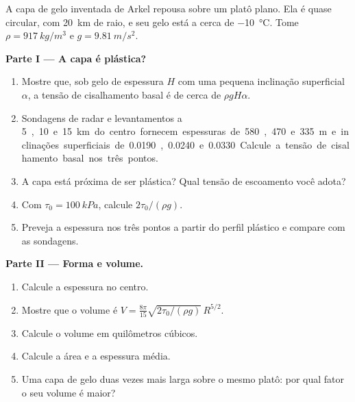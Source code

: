 \begin{problem}
\label{pb:b3:glaciology:1}
A capa de gelo inventada de Arkel repousa sobre um platô plano. Ela é quase
circular, com \qty{20}{km} de raio, e seu gelo está a cerca de \qty{-10}{\celsius}. Tome
$\rho = \qty{917}{kg/m^3}$ e $g = \qty{9.81}{m/s^2}$.

\medskip\noindent\textbf{Parte I --- A capa é plástica?}
\begin{enumerate}
\item Mostre que, sob gelo de espessura $H$ com uma pequena inclinação
  superficial $\alpha$, a tensão de cisalhamento basal é de cerca de $\rho gH\alpha$.
\item Sondagens de radar e levantamentos a \qty{5}, \qty{10} e \qty{15}{km} do centro
  fornecem espessuras de 580, 470 e \qty{335}{m} e inclinações superficiais de
  \num{0.0190}, \num{0.0240} e \num{0.0330}. Calcule a tensão de cisalhamento basal
  nos três pontos.
\item A capa está próxima de ser plástica? Qual tensão de escoamento você adota?
\item Com $\tau_0 = \qty{100}{kPa}$, calcule $2\tau_0/(\rho g)$.
\item Preveja a espessura nos três pontos a partir do perfil plástico e compare
  com as sondagens.
\end{enumerate}

\medskip\noindent\textbf{Parte II --- Forma e volume.}
\begin{enumerate}[resume]
\item Calcule a espessura no centro.
\item Mostre que o volume é $V = \frac{8\pi}{15}\sqrt{2\tau_0/(\rho
  g)}\,R^{5/2}$.
\item Calcule o volume em quilômetros cúbicos.
\item Calcule a área e a espessura média.
\item Uma capa de gelo duas vezes mais larga sobre o mesmo platô: por qual fator o seu
  volume é maior?
\end{enumerate}


\end{problem}
